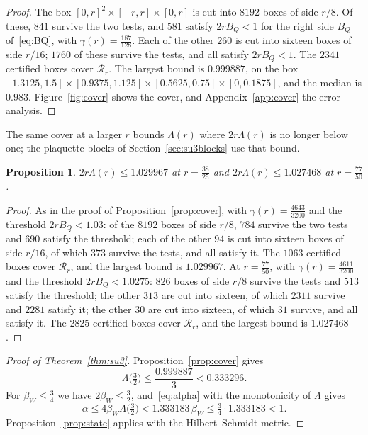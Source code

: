 \documentclass[11pt]{amsart}
\newtheorem{proposition}[theorem]{Proposition}
\theoremstyle{definition}
\theoremstyle{remark}
\numberwithin{equation}{section}
\begin{document}
\begin{proof}
The box $[0,r]^2\times[-r,r]\times[0,r]$ is cut into $8192$ boxes of side
$r/8$. Of these, $841$ survive the two tests, and $581$ satisfy
$2rB_Q<1$ for the right side $B_Q$ of~\eqref{eq:BQ}, with $\gamma(r)=
\frac{187}{128}$. Each of the other $260$ is cut into sixteen boxes of side
$r/16$; $1760$ of these survive the tests, and all satisfy $2rB_Q<1$. The
$2341$ certified boxes cover $\mathcal R_r$. The largest bound is $0.999887$,
on the box $[1.3125,1.5]\times[0.9375,1.125]\times[0.5625,0.75]
\times[0,0.1875]$, and the median is $0.983$. Figure~\ref{fig:cover} shows the cover, and
Appendix~\ref{app:cover} the error analysis.
\end{proof}

The same cover at a larger $r$ bounds $\Lambda(r)$ where $2r\Lambda(r)$ is
no longer below one; the plaquette blocks of Section~\ref{sec:su3blocks} use
that bound.

\begin{proposition}\label{prop:cover2}
$2r\Lambda(r)\le1.029967$ at $r=\frac{38}{25}$ and $2r\Lambda(r)\le1.027468$
at $r=\frac{77}{50}$.
\end{proposition}

\begin{proof}
As in the proof of Proposition~\ref{prop:cover}, with $\gamma(r)=
\frac{4643}{3200}$ and the threshold $2rB_Q<1.03$: of the $8192$ boxes of
side $r/8$, $784$ survive the two tests and $690$ satisfy the threshold; each
of the other $94$ is cut into sixteen boxes of side $r/16$, of which $373$
survive the tests, and all satisfy it. The $1063$ certified boxes cover
$\mathcal R_r$, and the largest bound is $1.029967$. At $r=\frac{77}{50}$,
with $\gamma(r)=\frac{4611}{3200}$ and the threshold $2rB_Q<1.0275$: $826$
boxes of side $r/8$ survive the tests and $513$ satisfy the threshold; the
other $313$ are cut into sixteen, of which $2311$ survive and $2281$ satisfy
it; the other $30$ are cut into sixteen, of which $31$ survive, and all
satisfy it. The $2825$ certified boxes cover $\mathcal R_r$, and the largest
bound is $1.027468$.
\end{proof}

\begin{proof}[Proof of Theorem~\ref{thm:su3}]
Proposition~\ref{prop:cover} gives
\[
\Lambda\bigl(\tfrac32\bigr)\le\frac{0.999887}3<0.333296 .
\]
For $\beta_W\le\frac34$ we have $2\beta_W\le\frac32$,
and~\eqref{eq:alpha} with the monotonicity of $\Lambda$ gives
\[
\alpha\le4\beta_W\Lambda\bigl(\tfrac32\bigr)<1.333183\,\beta_W\le
\tfrac34\cdot1.333183<1 .
\]
Proposition~\ref{prop:state} applies with the Hilbert--Schmidt metric.
\end{proof}
\end{document}

